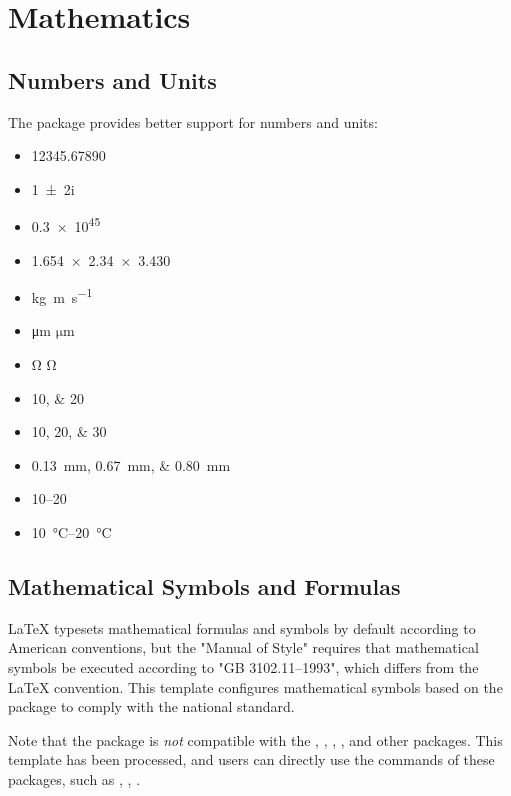 
\chapter{Mathematics}

\section{Numbers and Units}

The package  provides better support for numbers and units:
\begin{itemize}
  \item \num{12345.67890}
  \item \num{1+-2i}
  \item \num{.3e45}
  \item \num{1.654 x 2.34 x 3.430}
  \item \si{kg.m.s^{-1}}
  \item \si{\micro\meter} $\si{\micro\meter}$
  \item \si{\ohm} $\si{\ohm}$
  \item \numlist{10;20}
  \item \numlist{10;20;30}
  \item \SIlist{0.13;0.67;0.80}{\milli\metre}
  \item \numrange{10}{20}
  \item \SIrange{10}{20}{\degreeCelsius}
\end{itemize}



\section{Mathematical Symbols and Formulas}

\LaTeX{} typesets mathematical formulas and symbols by default according to American conventions,
but the "Manual of Style" requires that mathematical symbols be executed according to "GB 3102.11--1993",
which differs from the \LaTeX{} convention.
This template configures mathematical symbols based on the  package to comply with the national standard.

Note that the  package is \emph{not} compatible with the , , ,
,  and other packages.
This template has been processed, and users can directly use the commands of these packages, such as , ,
.

